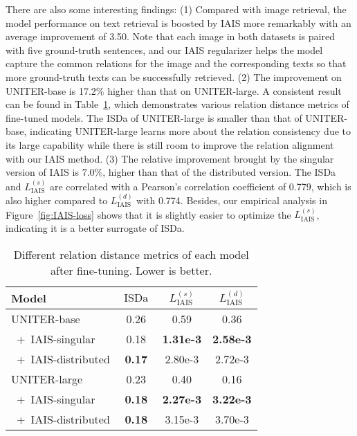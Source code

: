 \documentclass[11pt,a4paper]{article}
\begin{document}
There are also some interesting findings: 
(1) Compared with image retrieval, the model performance on text retrieval is boosted by IAIS more remarkably with an average improvement of 3.50.
Note that each image in both datasets is paired with five ground-truth sentences, and our IAIS regularizer helps the model capture the common relations for the image and the corresponding texts so that more ground-truth texts can be successfully retrieved.
(2) The improvement on UNITER-base is 17.2\% higher than that on UNITER-large. 
A consistent result can be found in Table~\ref{tb:ISD}, which demonstrates various relation distance metrics of fine-tuned models. 
The ISDa of UNITER-large is smaller than that of UNITER-base, indicating UNITER-large learns more about the relation consistency due to its large capability while there is still room to improve  the relation alignment with our IAIS method. 
(3) 
The relative improvement brought by the singular version of IAIS is 7.0\%, higher than that of the distributed version. 
The ISDa and $L^{(s)}_\text{IAIS}$ are correlated with a Pearson's correlation coefficient of 0.779, which is also higher compared to $L^{(d)}_\text{IAIS}$ with 0.774. 
Besides, our empirical analysis in Figure~\ref{fig:IAIS-loss} shows that it is slightly easier to optimize the $L^{(s)}_\text{IAIS}$, indicating it is a better surrogate of ISDa. 

\begin{table}[t]
\centering
\begin{adjustbox}{max width=0.38\textwidth}
\begin{tabular}{lccc}
\toprule
Model & $\operatorname{ISDa}$          & $L^{(s)}_\text{IAIS}$                        & $L^{(d)}_\text{IAIS}$                        \\ \midrule
UNITER-base    & 0.26          & 0.59                        & 0.36                        \\
~+~IAIS-singular & 0.18          & \textbf{1.31e-3} & \textbf{2.58e-3} \\
~+~IAIS-distributed      & \textbf{0.17} & 2.80e-3 & 2.72e-3 \\ \midrule
UNITER-large   & 0.23          & 0.40                        & 0.16                        \\
~+~IAIS-singular & \textbf{0.18} & \textbf{2.27e-3} & \textbf{3.22e-3} \\
~+~IAIS-distributed      & \textbf{0.18} & 3.15e-3 & 3.70e-3 \\ \bottomrule
\end{tabular}
\end{adjustbox}
\label{ISD}
\caption{Different relation distance metrics of each model after fine-tuning. Lower is better.}
\label{tb:ISD}
\end{table} 
\end{document}
